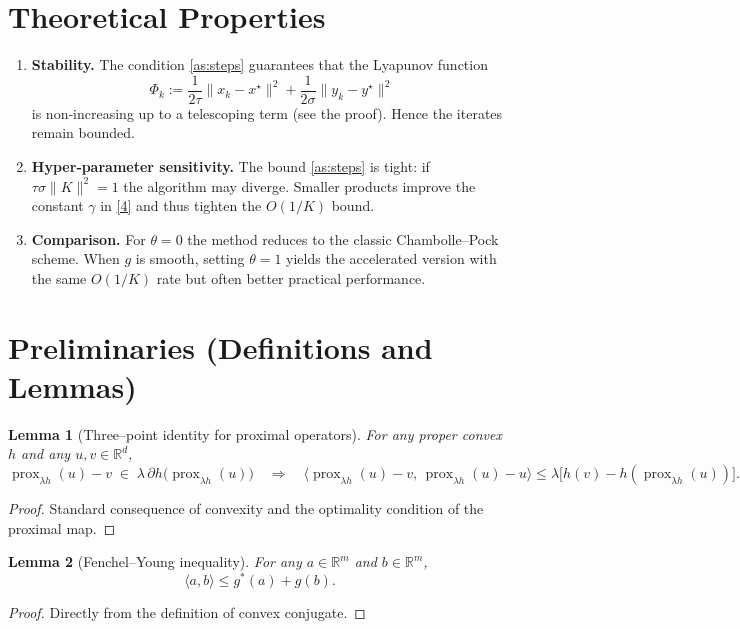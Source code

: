 \documentclass{article}
\newtheorem{lemma}{Lemma}
\newcommand{\prox}{\operatorname{prox}}
\begin{document}
\section*{Theoretical Properties}
\begin{enumerate}
\item \textbf{Stability.} The condition \eqref{as:steps} guarantees that the Lyapunov function 
\[
\Phi_{k}:=\frac{1}{2\tau}\|x_{k}-x^{\star}\|^{2}
          +\frac{1}{2\sigma}\|y_{k}-y^{\star}\|^{2}
\]
is non‑increasing up to a telescoping term (see the proof). Hence the iterates remain bounded.
\item \textbf{Hyper‑parameter sensitivity.} The bound \eqref{as:steps} is tight: if $\tau\sigma\|K\|^{2}=1$ the algorithm may diverge. Smaller products improve the constant $\gamma$ in \eqref{4} and thus tighten the $O(1/K)$ bound.
\item \textbf{Comparison.} For $\theta=0$ the method reduces to the classic Chambolle–Pock scheme. When $g$ is smooth, setting $\theta=1$ yields the accelerated version with the same $O(1/K)$ rate but often better practical performance.
\end{enumerate}

\section*{Preliminaries (Definitions and Lemmas)}
\begin{lemma}[Three–point identity for proximal operators]\label{lem:three}
For any proper convex $h$ and any $u,v\in\mathbb R^{d}$,
\[
\prox_{\lambda h}(u)-v
\;\in\;
\lambda\,\partial h\bigl(\prox_{\lambda h}(u)\bigr)
\quad\Longrightarrow\quad
\langle \prox_{\lambda h}(u)-v,\,\prox_{\lambda h}(u)-u\rangle
\le
\lambda\bigl[h(v)-h(\prox_{\lambda h}(u))\bigr].
\tag{6}
\]
\end{lemma}
\begin{proof}
Standard consequence of convexity and the optimality condition of the proximal map. \hfill\qedsymbol
\end{proof}

\begin{lemma}[Fenchel–Young inequality]\label{lem:fy}
For any $a\in\mathbb R^{m}$ and $b\in\mathbb R^{m}$,
\[
\langle a,b\rangle\le g^{*}(a)+g(b).
\tag{7}
\]
\end{lemma}
\begin{proof}
Directly from the definition of convex conjugate. \hfill\qedsymbol
\end{proof}
\end{document}
